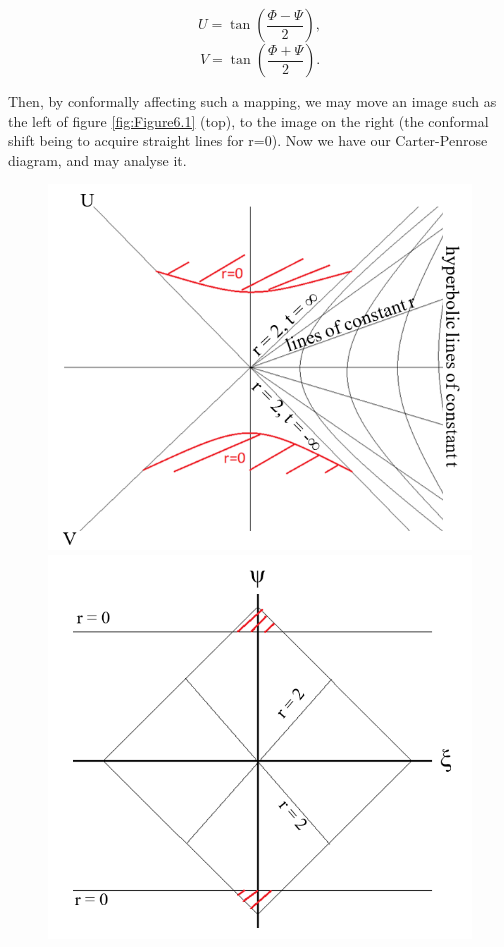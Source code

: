 \documentclass[oneside,openright,frontopenright, singlespacing]{dmathesis}
\begin{document}
	\[U = \tan\left(\frac{\Phi-\Psi}{2}\right),\]
	\[V = \tan\left(\frac{\Phi+\Psi}{2}\right).\]

\vspace{1em}
	Then, by conformally affecting such a mapping, we may move an image such as the left of figure \ref{fig:Figure6.1} (top), to the image on the right (the conformal shift being to acquire straight lines for r=0). Now we have our Carter-Penrose diagram, and may analyse it.

\vspace{1em}
\begin{figure}[!ht]
	\centering
	\begin{minipage}{0.5\textwidth}
		\centering
		\includegraphics[width=0.9\linewidth]{img/carter-penrose1}
	\end{minipage}%
	\hfill
	\begin{minipage}{0.5\textwidth}
		\centering
		\includegraphics[width=0.9\linewidth]{img/carter-penrose2}

\end{minipage}
\end{figure}
\end{document}
